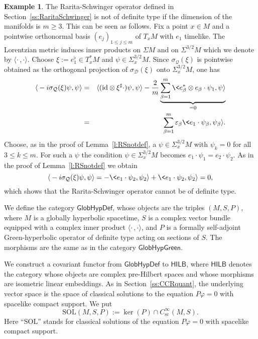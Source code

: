 \documentclass[a4paper,11pt]{amsart}
\theoremstyle{definition}
\newtheorem{ex}[thm]{Example}
\begin{document}
\begin{ex}\label{ex:RSnottypdef}
The Rarita-Schwinger operator defined in Section~\ref{ss:RaritaSchwinger} is not of definite type if the dimension of the manifolds is $m\geq 3$.
This can be seen as follows.
Fix a point $x\in M$ and a pointwise orthonormal basis $(e_j)_{1\leq j\leq m}$ of $T_xM$ with $e_1$ timelike.
The Lorentzian metric induces inner products on $\Sigma M$ and on ${\Sigma^{3/2}M}$ which we denote by ${\langle}\cdot\,,\cdot{\rangle}$.
Choose $\xi:=e_1^\flat\in T_x^*M$ and $\psi\in \Sigma^{3/2}_xM$.
Since $\sigma_{\mathcal{Q}}(\xi)$ is pointwise obtained as the orthogonal projection of $\sigma_{\mathcal{D}}(\xi)$ onto $\Sigma^{3/2}_xM$, one has
\begin{eqnarray*} 
{\langle}-i\sigma_{\mathcal{Q}}(\xi)\psi,\psi{\rangle}&=&{\langle}({\mathrm{id}}\otimes\xi^\sharp\cdot)\psi,\psi{\rangle}-\frac{2}{m}\underbrace{\sum_{\beta=1}^m\<e_\beta^*\otimes e_\beta\cdot\psi_1,\psi{\rangle}}_{=0}\\
&=&\sum_{\beta=1}^m{\varepsilon}_\beta\<e_1\cdot\psi_\beta,\psi_\beta{\rangle}.
\end{eqnarray*}
Choose, as in the proof of Lemma~\ref{l:RSnotdef}, a $\psi\in \Sigma^{3/2}_xM$ with $\psi_k=0$ for all $3\leq k\leq m$.
For such a $\psi$ the condition $\psi\in \Sigma^{3/2}_xM$ becomes $e_1\cdot\psi_1=e_2\cdot\psi_2$.
As in the proof of Lemma~\ref{l:RSnotdef} we obtain
\[{\langle}-i\sigma_{\mathcal{Q}}(\xi)\psi,\psi{\rangle}=-\<e_1\cdot\psi_2,\psi_2{\rangle}+\<e_1\cdot\psi_2,\psi_2{\rangle}=0, \]
which shows that the Rarita-Schwinger operator cannot be of definite type.
\end{ex}

We define the category ${\mathsf{GlobHypDef}}$, whose objects are the triples $(M,S,P)$, where $M$ is a globally hyperbolic spacetime, $S$ is a complex vector bundle equipped with a complex inner product ${\langle}\cdot\,,\cdot{\rangle}$, and $P$ is a formally self-adjoint Green-hyperbolic operator of definite type acting on sections of $S$.
The morphisms are the same as in the category ${\mathsf{GlobHypGreen}}$.

We construct a covariant functor from ${\mathsf{GlobHypDef}}$ to ${\mathsf{HILB}}$, where ${\mathsf{HILB}}$ denotes the category whose objects are complex pre-Hilbert spaces and whose morphisms are isometric linear embeddings.
As in Section~\ref{ss:CCRquant}, the underlying vector space is the space of classical solutions to the equation $P{\varphi}=0$ with spacelike compact support.
We put
\[{\mathrm{SOL}}(M,S,P):=\ker(P)\cap {C^\infty_\mathrm{sc}}(M,S).\]
Here ``${\mathrm{SOL}}$'' stands for classical solutions of the equation $P{\varphi}=0$ with spacelike compact support.
\end{document}
